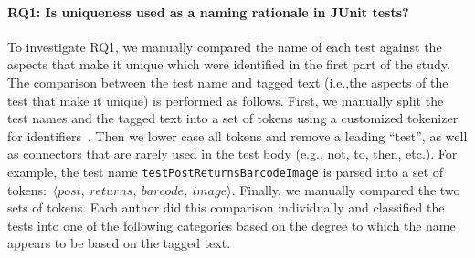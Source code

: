\paragraph{RQ1: Is uniqueness used as a naming rationale in JUnit tests?}

To investigate RQ1, we manually compared the name of each test against the aspects that make it unique which were identified in the first part of the study.
%
The comparison between the test name and tagged text (i.e.,the aspects of the test that make it unique) is performed as follows.
%
First, we manually split the test names and the tagged text into a set of tokens using a customized tokenizer for identifiers~\cite{enslen2009mining}.
%
Then we lower case all tokens and remove a leading \enquote{test}, as well as connectors that are rarely used in the test body (e.g., not, to, then, etc.).
%
For example, the test name \texttt{test\-Post\-Returns\-Barcode\-Image} is parsed into a set of tokens:~$\langle post,~returns,~barcode,~image \rangle$.
%
Finally, we manually compared the two sets of tokens.
%
Each author did this comparison individually and classified the tests into one of the following categories based on the degree to which the name appears to be based on the tagged text.

